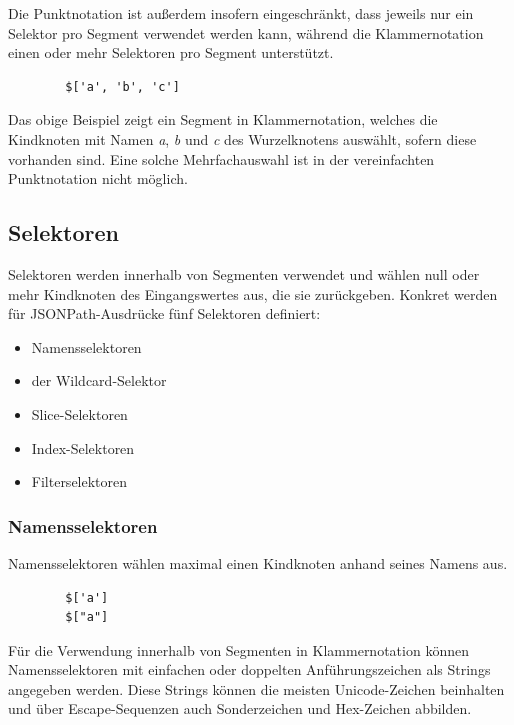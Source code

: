 \documentclass[oneside]{ausarbeitung}
\begin{document}
	Die Punktnotation ist außerdem insofern eingeschränkt, dass jeweils nur ein Selektor pro Segment verwendet werden kann, während die Klammernotation einen oder mehr Selektoren pro Segment unterstützt.
	
	\begin{lstlisting}
		$['a', 'b', 'c']
	\end{lstlisting}
	
	Das obige Beispiel zeigt ein Segment in Klammernotation, welches die Kindknoten mit Namen \textit{a}, \textit{b} und \textit{c} des Wurzelknotens auswählt, sofern diese vorhanden sind. Eine solche Mehrfachauswahl ist in der vereinfachten Punktnotation nicht möglich.
	
	
	
	\subsection{Selektoren}
	
	Selektoren werden innerhalb von Segmenten verwendet und wählen null oder mehr Kindknoten des Eingangswertes aus, die sie zurückgeben. Konkret werden für JSONPath-Ausdrücke fünf Selektoren definiert:
	
	\begin{itemize}
		\item Namensselektoren
		\item der Wildcard-Selektor
		\item Slice-Selektoren
		\item Index-Selektoren
		\item Filterselektoren
	\end{itemize}
	
	
	
	\subsubsection{Namensselektoren}
	
	Namensselektoren wählen maximal einen Kindknoten anhand seines Namens aus. 
	
	\begin{lstlisting}
		$['a']
		$["a"]
	\end{lstlisting}
	
	Für die Verwendung innerhalb von Segmenten in Klammernotation können Namensselektoren mit einfachen oder doppelten Anführungszeichen als Strings angegeben werden. Diese Strings können die meisten Unicode-Zeichen beinhalten und über Escape-Sequenzen auch Sonderzeichen und Hex-Zeichen abbilden. 
	
\end{document}
